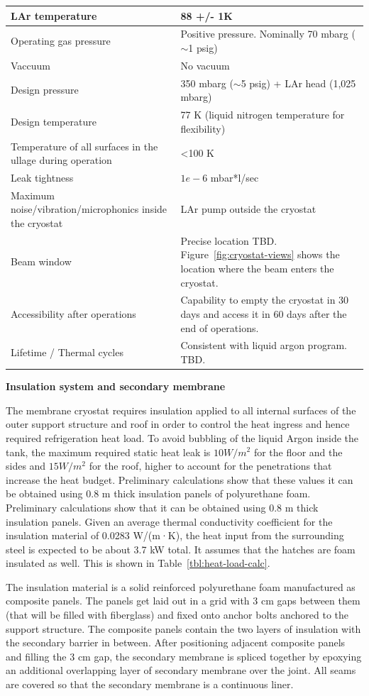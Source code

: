 \begin{table}[htpb]
\begin{tabular}{|p{}|p{}|}
LAr temperature   & 88 +/- 1K  \\ \hline
Operating gas pressure   &  Positive pressure. Nominally 70 mbarg ($\sim$1 psig) \\ \hline
 Vaccuum  &  No vacuum \\ \hline
 Design pressure  &  350 mbarg ($\sim$5 psig) + LAr head (1,025 mbarg) \\ \hline
Design temperature   &  77 K (liquid nitrogen temperature for flexibility) \\ \hline
Temperature of all surfaces in the ullage during operation   & \textless 100 K  \\ \hline
Leak tightness   & $1e-6$ mbar*l/sec   \\ \hline
Maximum noise/vibration/microphonics inside the cryostat   & LAr pump outside the cryostat  \\ \hline
Beam window   & Precise location TBD. Figure~\ref{fig:cryostat-views} shows the location where the beam enters the cryostat.  \\ \hline
 Accessibility after operations  & Capability to empty the cryostat in 30 days and access it in 60 days after the end of operations. \\ \hline
  Lifetime / Thermal cycles &  Consistent with liquid argon program. TBD. \\ \hline
 \end{tabular}
\end{table}

\textbf{Insulation system and secondary membrane}

The membrane cryostat requires insulation applied to all internal surfaces of the outer support structure 
and roof in order to control the heat ingress and hence required refrigeration heat load. 
To avoid bubbling of the liquid Argon inside the tank, the maximum required static heat leak is $10 W/m^2$ for the floor and the sides and $15 W/m^2$ for the roof, higher to account for the penetrations that increase the heat budget. Preliminary calculations show that these values it can be obtained using 0.8 m thick insulation panels of polyurethane foam.
Preliminary calculations show that it can be obtained using 0.8 m thick insulation panels. 
Given an 
average thermal conductivity coefficient for the insulation material of 0.0283 W/(m·K), the heat input 
from the surrounding steel is expected to be about 3.7 kW total. It assumes that the hatches are foam 
insulated as well. This is shown in Table~\ref{tbl:heat-load-calc}.

The insulation material is a solid reinforced polyurethane foam manufactured as composite panels. The 
panels get laid out in a grid with 3 cm gaps between them (that will be filled with fiberglass) and fixed 
onto anchor bolts anchored to the support structure. The composite panels contain the two layers of 
insulation with the secondary barrier in between. After positioning adjacent composite panels and filling 
the 3 cm gap, the secondary membrane is spliced together by epoxying an additional overlapping layer 
of secondary membrane over the joint. All seams are covered so that the secondary membrane is a 
continuous liner.


